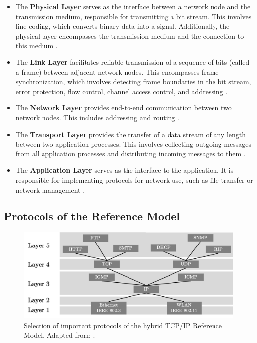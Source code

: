 	
\begin{itemize}
\item The \textbf{Physical Layer} serves as the interface between a network node and the transmission medium, responsible for transmitting a bit stream. This involves line coding, which converts binary data into a signal. Additionally, the physical layer encompasses the transmission medium and the connection to this medium \cite{Tanenbaum2010, Weigel2021}.
\item The \textbf{Link Layer} facilitates reliable transmission of a sequence of bits (called a frame) between adjacent network nodes. This encompasses frame synchronization, which involves detecting frame boundaries in the bit stream, error protection, flow control, channel access control, and addressing \cite{Weigel2021}.
\item The \textbf{Network Layer} provides end-to-end communication between two network nodes. This includes addressing and routing \cite{Tanenbaum2010, Weigel2021}.
\item The \textbf{Transport Layer} provides the transfer of a data stream of any length between two application processes. This involves collecting outgoing messages from all application processes and distributing incoming messages to them \cite{Weigel2021}.
\item The \textbf{Application Layer} serves as the interface to the application. It is responsible for implementing protocols for network use, such as file transfer or network management \cite{Weigel2021}.
\end{itemize}



\subsection{Protocols of the Reference Model} \label{chap:ProtosRefModel}

\begin{figure}[h]
    \centering
    \includegraphics[width=1\linewidth]{figures/tcpip_refmodel/image4.pdf}
    \caption[Selection of important protocols of the hybrid TCP/IP Reference Model]{Selection of important protocols of the hybrid TCP/IP Reference Model. Adapted from: \cite{Weigel2021}.}
    \label{fig:RefModelProtos}
\end{figure}


